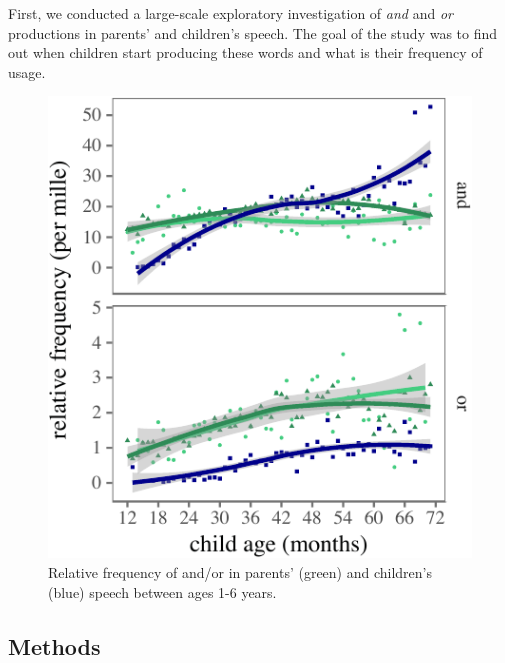 \documentclass[10pt, letterpaper]{article}
\newenvironment{CodeChunk}{}{}
\begin{document}
First, we conducted a large-scale exploratory investigation of
\emph{and} and \emph{or} productions in parents' and children's speech.
The goal of the study was to find out when children start producing
these words and what is their frequency of usage.

\begin{CodeChunk}
\begin{figure}[tb]
\includegraphics{figs/OverallConnectivePlots-1} \caption[Relative frequency of and/or in parents' (green) and children's (blue) speech between ages 1-6 years]{Relative frequency of and/or in parents' (green) and children's (blue) speech between ages 1-6 years.}\label{fig:OverallConnectivePlots}
\end{figure}
\end{CodeChunk}

\subsection{Methods}\label{methods}
\end{document}
